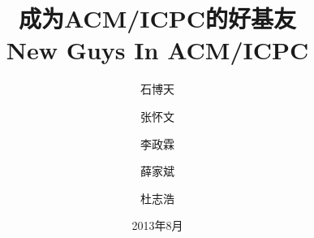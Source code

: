 \title{成为ACM/ICPC的好基友\\New Guys In ACM/ICPC}
\author{石博天 \and 张怀文 \and 李政霖 \and 薛家斌 \and 杜志浩 }
\date{2013年8月}
\maketitle